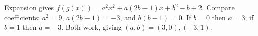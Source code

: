 Expansion gives $f(g(x))=a^2x^2+a(2b-1)x+b^2-b+2$. Compare coefficients: $a^2=9$, $a(2b-1)=-3$, and $b(b-1)=0$. If $b=0$ then $a=3$; if $b=1$ then $a=-3$. Both work, giving $\boxed{(a,b)=(3,0),(-3,1)}$.
